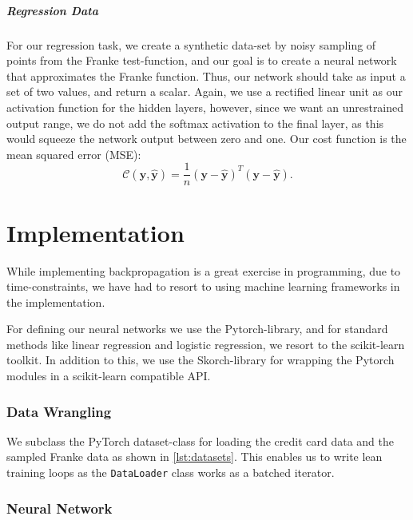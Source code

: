 \documentclass[a4paper, oneside, article]{memoir}
\newcommand{\y}{\bm{y}}
\newcommand{\yhat}{\hat{\bm{y}}}
\newcommand{\mat}[1]{\bm{#1}}
\newcommand{\cost}{\mathcal{C}}
\begin{document}
	\paragraph{Regression Data}
		
	For our regression task, we create a synthetic data-set by noisy
	sampling of points from the Franke test-function, and our goal is to
	create a neural network that approximates the Franke function. Thus,
	our network should take as input a set of two values, and return a
	scalar. Again, we use a rectified linear unit as our activation
	function for the hidden layers, however, since we want an unrestrained
	output range, we do not add the softmax activation to the final layer,
	as this would squeeze the network output between zero and one.
	Our cost function is the mean squared error (MSE):
	\begin{equation}
		\cost(\mat{y}, \yhat) = \frac{1}{n} (\y - \yhat)^T (\y - \yhat).
	\end{equation}

	\chapter{Implementation}	
	
	While implementing backpropagation is a great exercise in programming,
	due to time-constraints, we have had to resort to using machine
	learning frameworks in the implementation.

	For defining our neural networks we use the Pytorch-library, and for
	standard methods like linear regression and logistic regression, we
	resort to the scikit-learn toolkit. In addition to this, we use the
	Skorch-library for wrapping the Pytorch modules in a scikit-learn
	compatible API.

	\subsection{Data Wrangling}
	
	We subclass the PyTorch dataset-class for loading the credit card data
	and the sampled Franke data as shown in \cref{lst:datasets}. This
	enables us to write lean training loops as the \texttt{DataLoader}
	class works as a batched iterator.

	\subsection{Neural Network}	
	
\end{document}
